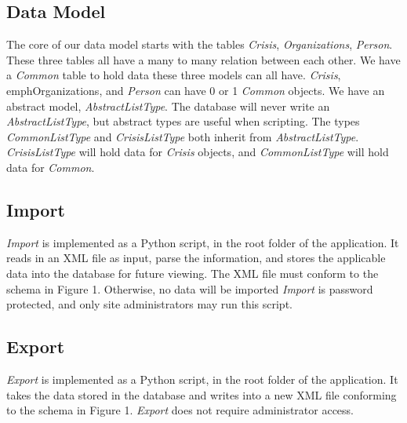\documentclass[12pt]{report}
\begin{document}
\subsection*{Data Model}
The core of our data model starts with the tables \emph{Crisis}, \emph{Organizations}, \emph{Person}.
These three tables all have a many to many relation between each other.
We have a \emph{Common} table to hold data these three models can all have.
\emph{Crisis}, emph{Organizations}, and \emph{Person} can have 0 or 1 \emph{Common} objects.
We have an abstract model, \emph{AbstractListType}.
The database will never write an \emph{AbstractListType}, but abstract types are useful when scripting.
The types \emph{CommonListType} and \emph{CrisisListType} both inherit from \emph{AbstractListType}.
\emph{CrisisListType} will hold data for \emph{Crisis} objects, and \emph{CommonListType} will hold data for \emph{Common}.

\subsection*{Import}
\emph{Import} is implemented as a Python script, in the root folder of the application.
It reads in an XML file as input, parse the information, and stores the applicable data into the database for future viewing.
The XML file must conform to the schema in Figure 1.
Otherwise, no data will be imported
\emph{Import} is password protected, and only site administrators may run this script.

\subsection*{Export}
\emph{Export} is implemented as a Python script, in the root folder of the application.
It takes the data stored in the database and writes into a new XML file conforming to the schema in Figure 1.
\emph{Export} does not require administrator access.
\end{document}
